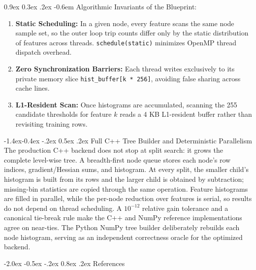 \documentclass[11pt,a4paper]{article}
\makeatletter
\renewcommand\section{\@startsection {section}{1}{\z@}%
                                   {-2.0ex \@plus -0.5ex \@minus -.2ex}%
                                   {0.8ex \@plus.2ex}%
                                   {\normalfont\large\bfseries}}
\renewcommand\subsection{\@startsection{subsection}{2}{\z@}%
                                     {-1.4ex\@plus -0.4ex \@minus -.2ex}%
                                     {0.5ex \@plus .2ex}%
                                     {\normalfont\normalsize\bfseries}}
\renewcommand\paragraph{\@startsection{paragraph}{4}{\z@}%
                                     {0.9ex \@plus0.3ex \@minus.2ex}%
                                     {-0.6em}%
                                     {\normalfont\normalsize\bfseries}}
\makeatother
\begin{document}
\paragraph{Algorithmic Invariants of the Blueprint:}
\begin{enumerate}
    \item \textbf{Static Scheduling:} In a given node, every feature scans the same node sample set, so the outer loop trip counts differ only by the static distribution of features across threads. \texttt{schedule(static)} minimizes OpenMP thread dispatch overhead.
    \item \textbf{Zero Synchronization Barriers:} Each thread writes exclusively to its private memory slice \texttt{hist\_buffer[k * 256]}, avoiding false sharing across cache lines.
    \item \textbf{L1-Resident Scan:} Once histograms are accumulated, scanning the 255 candidate thresholds for feature $k$ reads a 4 KB L1-resident buffer rather than revisiting training rows.
\end{enumerate}

\subsection{Full C++ Tree Builder and Deterministic Parallelism}
The production C++ backend does not stop at split search: it grows the complete level-wise tree. A breadth-first node queue stores each node's row indices, gradient/Hessian sums, and histogram. At every split, the smaller child's histogram is built from its rows and the larger child is obtained by subtraction; missing-bin statistics are copied through the same operation. Feature histograms are filled in parallel, while the per-node reduction over features is serial, so results do not depend on thread scheduling. A $10^{-12}$ relative gain tolerance and a canonical tie-break rule make the C++ and NumPy reference implementations agree on near-ties. The Python NumPy tree builder deliberately rebuilds each node histogram, serving as an independent correctness oracle for the optimized backend.

\section{References}
\end{document}
